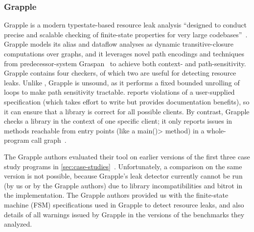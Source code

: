 

\subsubsection{Grapple}
\label{sec:grapple}

Grapple is a modern typestate-based resource leak analysis
``designed to conduct precise and scalable checking of finite-state properties for very
large codebases''~\cite{zuo2019grapple}. Grapple models its alias and
dataflow analyses as dynamic transitive-closure computations over graphs, and
it leverages novel path encodings and techniques from predecessor-system
Graspan~\cite{wang2017graspan} to achieve both context- and path-sensitivity.  
Grapple contains four checkers, of which two are useful for detecting
resource leaks.  Unlike \tool, Grapple is unsound, as it performs a fixed bounded unrolling
of loops to make path sensitivity tractable.
\Tool reports violations of a user-supplied specification
(which takes effort to write but provides documentation benefits), so it
can ensure that a library is correct for all possible clients.  By
contrast, Grapple checks a library in the context of one specific client; it
only reports issues in methods reachable from entry points (like a \<main()>
method) in a whole-program call graph~\cite{grapplepersonal}.

The Grapple authors evaluated their tool on earlier versions of the first three
case study programs in \cref{sec:case-studies}~\cite{zuo2019grapple}.
Unfortunately, a comparison on the same version is not possible, because
Grapple's leak detector currently cannot be run
(by us or by the Grapple authors) due to library incompatibilities and bitrot in
the implementation. The Grapple authors provided us with the finite-state
machine (FSM) specifications used in Grapple to detect resource leaks, and also
details of all warnings issued by Grapple in the versions of the benchmarks they
analyzed.

